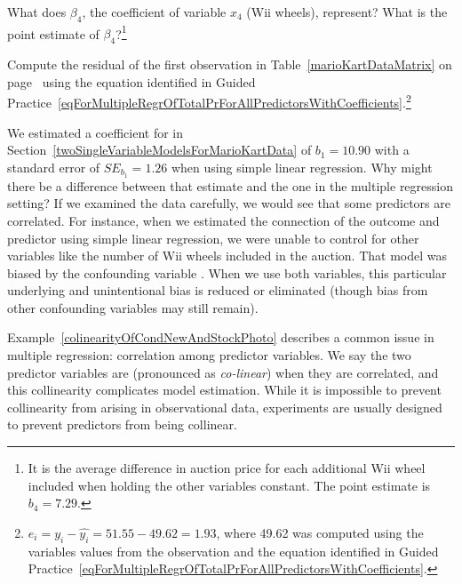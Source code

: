 \begin{exercise}
What does $\beta_4$, the coefficient of variable $x_4$ (Wii wheels), represent? What is the point estimate of $\beta_4$?\footnote{It is the average difference in auction price for each additional Wii wheel included when holding the other variables constant. The point estimate is $b_4 = 7.29$.}
\end{exercise}

\begin{exercise} \label{computeMultipleRegressionResidualForMarioKart}
Compute the residual of the first observation in Table~\ref{marioKartDataMatrix} on page~\pageref{marioKartDataMatrix} using the equation identified in Guided Practice~\ref{eqForMultipleRegrOfTotalPrForAllPredictorsWithCoefficients}.\footnote{$e_i = y_i - \hat{y_i} = 51.55 - 49.62 = 1.93$, where 49.62 was computed using the variables values from the observation and the equation identified in Guided Practice~\ref{eqForMultipleRegrOfTotalPrForAllPredictorsWithCoefficients}.}
\end{exercise}

\begin{example}{We estimated a coefficient for  in Section~\ref{twoSingleVariableModelsForMarioKartData} of $b_1 = 10.90$ with a standard error of $SE_{b_1} = 1.26$ when using simple linear regression. Why might there be a difference between that estimate and the one in the multiple regression setting?} \label{colinearityOfCondNewAndStockPhoto}
If we examined the data carefully, we would see that some predictors are correlated. For instance, when we estimated the connection of the outcome  and predictor  using simple linear regression, we were unable to control for other variables like the number of Wii wheels included in the auction. That model was biased by the confounding variable . When we use both variables, this particular underlying and unintentional bias is reduced or eliminated (though bias from other confounding variables may still remain).
\end{example}

Example~\ref{colinearityOfCondNewAndStockPhoto} describes a common issue in multiple regression: correlation among predictor variables. We say the two predictor variables are  (pronounced as \emph{co-linear}) when they are correlated, and this collinearity complicates model estimation. While it is impossible to prevent collinearity from arising in observational data, experiments are usually designed to prevent predictors from being collinear.

